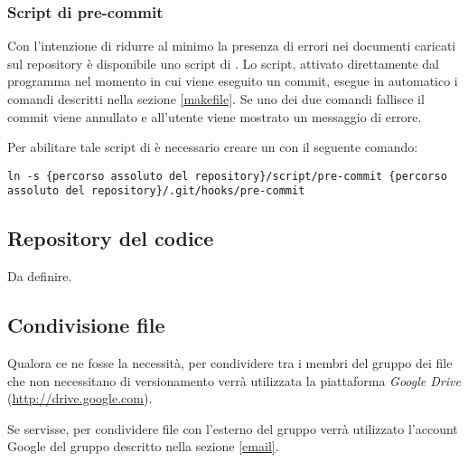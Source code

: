 \subsubsection{Script di pre-commit}

Con l'intenzione di ridurre al minimo la presenza di errori nei documenti caricati sul repository è disponibile uno script di . Lo script, attivato direttamente dal programma  nel momento in cui viene eseguito un commit, esegue in automatico i comandi descritti nella sezione \ref{makefile}. Se uno dei due comandi fallisce il commit viene annullato e all'utente viene mostrato un messaggio di errore.

Per abilitare tale script di  è necessario creare un  con il seguente comando:
\begin{lstlisting}
ln -s {percorso assoluto del repository}/script/pre-commit {percorso assoluto del repository}/.git/hooks/pre-commit
\end{lstlisting}

\subsection{Repository del codice}

Da definire.

\subsection{Condivisione file}

Qualora ce ne fosse la necessità, per condividere tra i membri del gruppo dei file che non necessitano di versionamento verrà utilizzata la piattaforma \emph{Google Drive} (\url{http://drive.google.com}).

Se servisse, per condividere file con l'esterno del gruppo verrà utilizzato l'account Google del gruppo descritto nella sezione \ref{email}.
